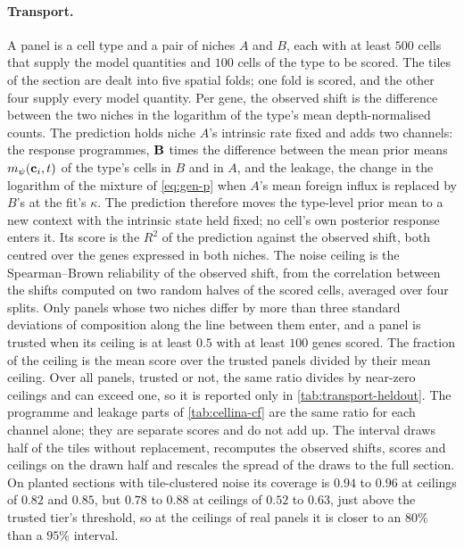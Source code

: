 \paragraph{Transport.} A panel is a cell type and a pair of niches $A$ and $B$, each with at least $500$ cells that supply the model quantities and $100$ cells of the type to be scored. The tiles of the section are dealt into five spatial folds; one fold is scored, and the other four supply every model quantity. Per gene, the observed shift is the difference between the two niches in the logarithm of the type's mean depth-normalised counts. The prediction holds niche $A$'s intrinsic rate fixed and adds two channels: the response programmes, $\mathbf{B}$ times the difference between the mean prior means $m_{\psi}(\mathbf{c}_i, t)$ of the type's cells in $B$ and in $A$, and the leakage, the change in the logarithm of the mixture of \cref{eq:gen-p} when $A$'s mean foreign influx is replaced by $B$'s at the fit's $\kappa$. The prediction therefore moves the type-level prior mean to a new context with the intrinsic state held fixed; no cell's own posterior response enters it. Its score is the $R^2$ of the prediction against the observed shift, both centred over the genes expressed in both niches. The noise ceiling is the Spearman--Brown reliability of the observed shift, from the correlation between the shifts computed on two random halves of the scored cells, averaged over four splits. Only panels whose two niches differ by more than three standard deviations of composition along the line between them enter, and a panel is trusted when its ceiling is at least $0.5$ with at least $100$ genes scored. The fraction of the ceiling is the mean score over the trusted panels divided by their mean ceiling. Over all panels, trusted or not, the same ratio divides by near-zero ceilings and can exceed one, so it is reported only in \cref{tab:transport-heldout}. The programme and leakage parts of \cref{tab:cellina-cf} are the same ratio for each channel alone; they are separate scores and do not add up. The interval draws half of the tiles without replacement, recomputes the observed shifts, scores and ceilings on the drawn half and rescales the spread of the draws to the full section. On planted sections with tile-clustered noise its coverage is $0.94$ to $0.96$ at ceilings of $0.82$ and $0.85$, but $0.78$ to $0.88$ at ceilings of $0.52$ to $0.63$, just above the trusted tier's threshold, so at the ceilings of real panels it is closer to an $80\%$ than a $95\%$ interval.
